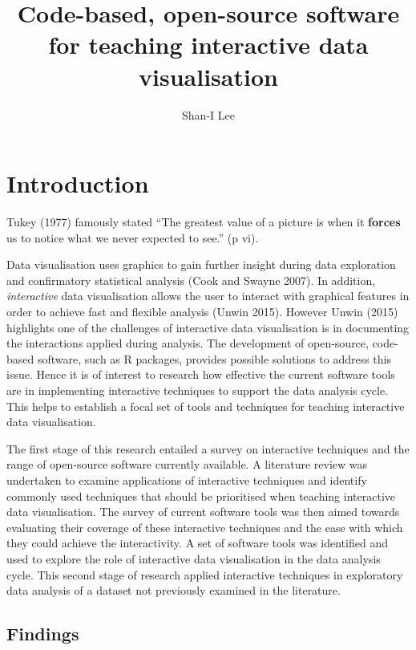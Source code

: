 \documentclass[]{book}
\title{Code-based, open-source software for teaching interactive data
visualisation}
\author{Shan-I Lee}
\date{}
\theoremstyle{definition}
\theoremstyle{definition}
\theoremstyle{definition}
\theoremstyle{remark}
\begin{document}
\maketitle

{
\setcounter{tocdepth}{1}
\tableofcontents
}
\chapter{Introduction}\label{introduction}

Tukey (1977) famously stated ``The greatest value of a picture is when
it \textbf{forces} us to notice what we never expected to see.'' (p vi).

Data visualisation uses graphics to gain further insight during data
exploration and confirmatory statistical analysis (Cook and Swayne
2007). In addition, \emph{interactive} data visualisation allows the
user to interact with graphical features in order to achieve fast and
flexible analysis (Unwin 2015). However Unwin (2015) highlights one of
the challenges of interactive data visualisation is in documenting the
interactions applied during analysis. The development of open-source,
code-based software, such as R packages, provides possible solutions to
address this issue. Hence it is of interest to research how effective
the current software tools are in implementing interactive techniques to
support the data analysis cycle. This helps to establish a focal set of
tools and techniques for teaching interactive data visualisation.

The first stage of this research entailed a survey on interactive
techniques and the range of open-source software currently available. A
literature review was undertaken to examine applications of interactive
techniques and identify commonly used techniques that should be
prioritised when teaching interactive data visualisation. The survey of
current software tools was then aimed towards evaluating their coverage
of these interactive techniques and the ease with which they could
achieve the interactivity. A set of software tools was identified and
used to explore the role of interactive data visualisation in the data
analysis cycle. This second stage of research applied interactive
techniques in exploratory data analysis of a dataset not previously
examined in the literature.

\section{Findings}\label{findings}
\end{document}
